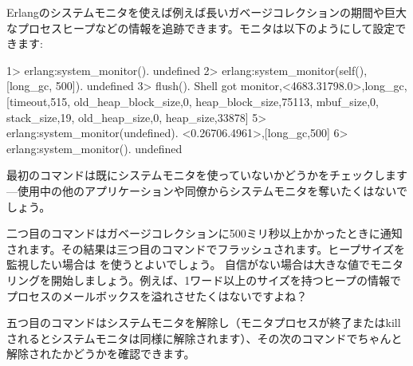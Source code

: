 Erlangのシステムモニタを使えば例えば長いガベージコレクションの期間や巨大なプロセスヒープなどの情報を追跡できます。モニタは以下のようにして設定できます:

\begin{VerbatimEshell}
1> erlang:system_monitor().
undefined
2> erlang:system_monitor(self(), [{long_gc, 500}]).
undefined
3> flush().
Shell got {monitor,<4683.31798.0>,long_gc,
                   [{timeout,515},
                    {old_heap_block_size,0},
                    {heap_block_size,75113},
                    {mbuf_size,0},
                    {stack_size,19},
                    {old_heap_size,0},
                    {heap_size,33878}]}
5> erlang:system_monitor(undefined).
{<0.26706.4961>,[{long_gc,500}]}
6> erlang:system_monitor().
undefined
\end{VerbatimEshell}

最初のコマンドは既にシステムモニタを使っていないかどうかをチェックします---使用中の他のアプリケーションや同僚からシステムモニタを奪いたくはないでしょう。

二つ目のコマンドはガベージコレクションに500ミリ秒以上かかったときに通知されます。その結果は三つ目のコマンドでフラッシュされます。ヒープサイズを監視したい場合は  を使うとよいでしょう。
自信がない場合は大きな値でモニタリングを開始しましょう。例えば、1ワード以上のサイズを持つヒープの情報でプロセスのメールボックスを溢れさせたくはないですよね？

五つ目のコマンドはシステムモニタを解除し（モニタプロセスが終了またはkillされるとシステムモニタは同様に解除されます）、その次のコマンドでちゃんと解除されたかどうかを確認できます。

